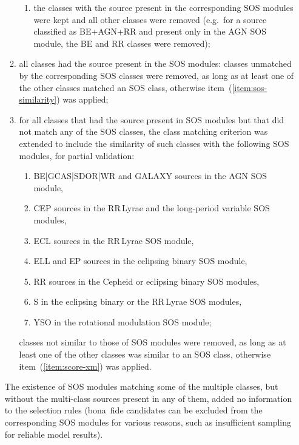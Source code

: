 \documentclass[longauth]{aa}
\begin{document}
\begin{enumerate}
\begin{enumerate}
\begin{enumerate}
           \item the classes with the source present in the corresponding SOS modules were kept and all other classes were removed (e.g.\ for a source classified as BE+AGN+RR and present only in the AGN SOS module, the BE and RR classes were removed); 
        \end{enumerate}         
        \item all classes had the source present in the SOS modules: classes unmatched by the corresponding SOS classes were removed, as long as at least one of the other classes matched an SOS class, otherwise item~(\ref{item:sos-similarity}) was applied;
        \item\label{item:sos-similarity} for all classes that had the source present in SOS modules but that did not match any of the SOS classes, the class matching criterion was extended to include the similarity of such classes with the following SOS modules, for partial validation:
        \begin{enumerate}
          \item BE|GCAS|SDOR|WR and GALAXY sources in the AGN SOS module,
          \item CEP sources in the RR\,Lyrae and the long-period variable SOS modules,
          \item ECL sources in the RR\,Lyrae SOS module,
          \item ELL and EP sources in the eclipsing binary SOS module,
          \item RR sources in the Cepheid or eclipsing binary SOS modules,
          \item S in the eclipsing binary or the RR\,Lyrae SOS modules,
          \item YSO in the rotational modulation SOS module;
    \end{enumerate}
    classes not similar to those of SOS modules were removed, as long as at least one of the other classes was similar to an SOS class, otherwise item~(\ref{item:score-xm}) was applied.
  \end{enumerate}
  The existence of SOS modules matching some of the multiple classes, but without the multi-class sources present in any of them, added no information to the selection rules (bona~fide candidates can be excluded from the corresponding SOS modules for various reasons, such as insufficient sampling for reliable model results).
\end{enumerate}

\end{document}
